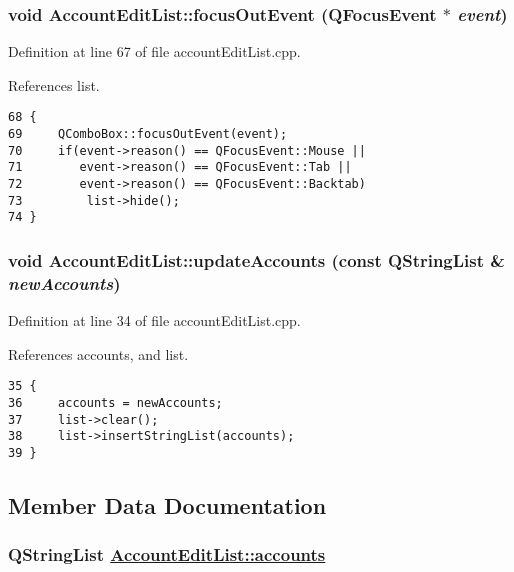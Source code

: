 \hypertarget{classAccountEditList_a4}{
\subsubsection[focusOutEvent]{\setlength{\rightskip}{0pt plus 5cm}void Account\-Edit\-List::focus\-Out\-Event (QFocus\-Event $\ast$ {\em event})}}
\label{classAccountEditList_a4}


Definition at line 67 of file account\-Edit\-List.cpp.

References list.

\footnotesize\begin{verbatim}68 {
69     QComboBox::focusOutEvent(event);
70     if(event->reason() == QFocusEvent::Mouse ||
71        event->reason() == QFocusEvent::Tab ||
72        event->reason() == QFocusEvent::Backtab)
73         list->hide();
74 }
\end{verbatim}\normalsize 


\hypertarget{classAccountEditList_a2}{
\subsubsection[updateAccounts]{\setlength{\rightskip}{0pt plus 5cm}void Account\-Edit\-List::update\-Accounts (const QString\-List \& {\em new\-Accounts})}}
\label{classAccountEditList_a2}


Definition at line 34 of file account\-Edit\-List.cpp.

References accounts, and list.

\footnotesize\begin{verbatim}35 {
36     accounts = newAccounts;
37     list->clear();
38     list->insertStringList(accounts);
39 }
\end{verbatim}\normalsize 




\subsection{Member Data Documentation}
\hypertarget{classAccountEditList_r0}{
\subsubsection[accounts]{\setlength{\rightskip}{0pt plus 5cm}QString\-List \hyperlink{classAccountEditList_r0}{Account\-Edit\-List::accounts}}}
\label{classAccountEditList_r0}


